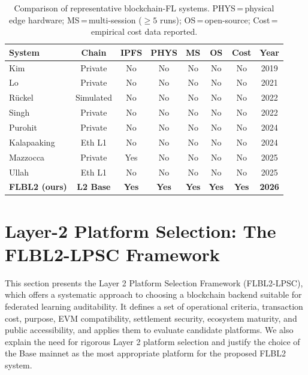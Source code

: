 \documentclass{llncs}
\begin{document}
\begin{table}[t]
\caption{Comparison of representative blockchain-FL systems.
  PHYS\,=\,physical edge hardware; MS\,=\,multi-session (${\geq}5$ runs);
  OS\,=\,open-source; Cost\,=\,empirical cost data reported.}
\label{tab:related}
\centering
\footnotesize
\setlength{\tabcolsep}{3pt}
\begin{tabular}{lccccccc}
\toprule
\textbf{System} & \textbf{Chain} & \textbf{IPFS} & \textbf{PHYS} &
  \textbf{MS} & \textbf{OS} & \textbf{Cost} & \textbf{Year} \\
\midrule
Kim~\cite{kim2019blockchained}              & Private   & No  & No  & No  & No  & No  & 2019 \\
Lo~\cite{lo2021trustworthy}                 & Private   & No  & No  & No  & No  & No  & 2021 \\
Rückel~\cite{ruckel2022fairness}            & Simulated & No  & No  & No  & No  & No  & 2022 \\
Singh~\cite{singh2022framework}             & Private   & No  & No  & No  & No  & No  & 2022 \\
Purohit~\cite{purohit2024fedblocks}         & Private   & No  & No  & No  & No  & No  & 2024 \\
Kalapaaking~\cite{kalapaaking2024auditable} & Eth L1    & No  & No  & No  & No  & No  & 2024 \\
Mazzocca~\cite{mazzocca2025fedcoordination} & Private   & Yes & No  & No  & No  & No  & 2025 \\
Ullah~\cite{ullah2025spbfl}                 & Eth L1    & No  & No  & No  & No  & No  & 2025 \\
\textbf{FLBL2 (ours)} & \textbf{L2 Base} & \textbf{Yes} & \textbf{Yes} &
  \textbf{Yes} & \textbf{Yes} & \textbf{Yes} & \textbf{2026} \\
\bottomrule
\end{tabular}
\end{table}


\FloatBarrier
\section{Layer-2 Platform Selection: The FLBL2-LPSC Framework}
\label{sec:l2selection}
This section presents the Layer 2 Platform Selection Framework (FLBL2-LPSC), which offers a systematic approach to choosing a blockchain backend suitable for federated learning auditability. It defines a set of operational criteria, transaction cost, purpose, EVM compatibility, settlement security, ecosystem maturity, and public accessibility, and applies them to evaluate candidate platforms. We also explain the need for rigorous Layer 2 platform selection and justify the choice of the Base mainnet as the most appropriate platform for the proposed FLBL2 system.
\end{document}
